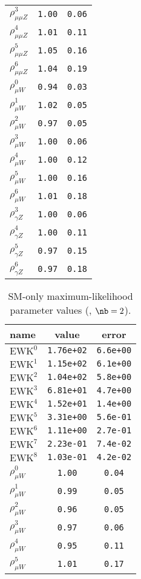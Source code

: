 \begin{table}
\begin{tabular}{lcc}
$\rho_{\mu\mu Z}^{3}$ & {\tt 1.00} & {\tt 0.06}\\
$\rho_{\mu\mu Z}^{4}$ & {\tt 1.01} & {\tt 0.11}\\
$\rho_{\mu\mu Z}^{5}$ & {\tt 1.05} & {\tt 0.16}\\
$\rho_{\mu\mu Z}^{6}$ & {\tt 1.04} & {\tt 0.19}\\
$\rho_{\mu W}^{0}$ & {\tt 0.94} & {\tt 0.03}\\
$\rho_{\mu W}^{1}$ & {\tt 1.02} & {\tt 0.05}\\
$\rho_{\mu W}^{2}$ & {\tt 0.97} & {\tt 0.05}\\
$\rho_{\mu W}^{3}$ & {\tt 1.00} & {\tt 0.06}\\
$\rho_{\mu W}^{4}$ & {\tt 1.00} & {\tt 0.12}\\
$\rho_{\mu W}^{5}$ & {\tt 1.00} & {\tt 0.16}\\
$\rho_{\mu W}^{6}$ & {\tt 1.01} & {\tt 0.18}\\
$\rho_{\gamma Z}^{3}$ & {\tt 1.00} & {\tt 0.06}\\
$\rho_{\gamma Z}^{4}$ & {\tt 1.00} & {\tt 0.11}\\
$\rho_{\gamma Z}^{5}$ & {\tt 0.97} & {\tt 0.15}\\
$\rho_{\gamma Z}^{6}$ & {\tt 0.97} & {\tt 0.18}\\
\hline
\end{tabular}
\end{table}

\begin{table}\centering
\caption{SM-only maximum-likelihood parameter values (\njetlow, $\nb = 2$).}
\label{tab:mlParameterValues2b_le3j}
\begin{tabular}{lcc}name & value & error \\ \hline
$\mathrm{EWK}^{0}$ & {\tt  1.76e+02} & {\tt  6.6e+00}\\
$\mathrm{EWK}^{1}$ & {\tt  1.15e+02} & {\tt  6.1e+00}\\
$\mathrm{EWK}^{2}$ & {\tt  1.04e+02} & {\tt  5.8e+00}\\
$\mathrm{EWK}^{3}$ & {\tt  6.81e+01} & {\tt  4.7e+00}\\
$\mathrm{EWK}^{4}$ & {\tt  1.52e+01} & {\tt  1.4e+00}\\
$\mathrm{EWK}^{5}$ & {\tt  3.31e+00} & {\tt  5.6e-01}\\
$\mathrm{EWK}^{6}$ & {\tt  1.11e+00} & {\tt  2.7e-01}\\
$\mathrm{EWK}^{7}$ & {\tt  2.23e-01} & {\tt  7.4e-02}\\
$\mathrm{EWK}^{8}$ & {\tt  1.03e-01} & {\tt  4.2e-02}\\
$\rho_{\mu W}^{0}$ & {\tt 1.00} & {\tt 0.04}\\
$\rho_{\mu W}^{1}$ & {\tt 0.99} & {\tt 0.05}\\
$\rho_{\mu W}^{2}$ & {\tt 0.96} & {\tt 0.05}\\
$\rho_{\mu W}^{3}$ & {\tt 0.97} & {\tt 0.06}\\
$\rho_{\mu W}^{4}$ & {\tt 0.95} & {\tt 0.11}\\
$\rho_{\mu W}^{5}$ & {\tt 1.01} & {\tt 0.17}\\
\hline
\end{tabular}
\end{table}


